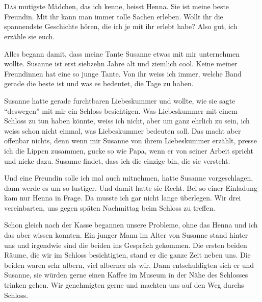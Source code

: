 \chapter*{}
\lettrine[lines=3]{\color{DeepPink}D}{as} mutigste Mädchen, das ich kenne, heisst Henna. Sie ist meine beste Freundin. Mit ihr kann man immer tolle Sachen erleben. Wollt ihr die spannendste Geschichte hören, die ich je mit ihr erlebt habe? Also gut, ich erzähle sie euch.

Alles begann damit, dass meine Tante Susanne etwas mit mir unternehmen wollte.
Susanne ist erst siebzehn Jahre alt und ziemlich cool. Keine meiner Freundinnen
hat eine so junge Tante. Von ihr weiss ich immer, welche Band gerade die beste
ist und was es bedeutet, die Tage zu haben.

Susanne hatte gerade furchtbaren Liebeskummer und wollte, wie sie sagte
\enquote{deswegen} mit mir ein Schloss besichtigen. Was Liebeskummer mit einem
Schloss zu tun haben könnte, weiss ich nicht, aber um ganz ehrlich zu sein, ich weiss schon nicht einmal, was Liebeskummer bedeuten soll. Das macht aber offenbar nichts, denn wenn mir Susanne von ihrem Liebeskummer erzählt, presse ich die Lippen zusammen, gucke so wie Papa, wenn er von seiner Arbeit spricht und nicke dazu. Susanne findet, dass ich die einzige bin, die sie versteht.

Und eine Freundin solle ich mal auch mitnehmen, hatte Susanne vorgeschlagen, dann werde es um so lustiger. Und damit hatte sie Recht. Bei so einer Einladung kam nur Henna in Frage. Da musste ich gar nicht lange überlegen. Wir drei vereinbarten, uns gegen späten Nachmittag beim Schloss zu treffen.

Schon gleich nach der Kasse begannen unsere Probleme, ohne das Henna und ich das aber wissen konnten. Ein junger Mann im Alter von Susanne stand hinter uns und irgendwie sind die beiden ins Gespräch gekommen. Die ersten beiden Räume, die wir im Schloss besichtigten, stand er die ganze Zeit neben uns. Die beiden waren sehr albern, viel alberner als wir. Dann entschuldigten sich er und Susanne, sie würden gerne einen Kaffee im Museum in der Nähe des Schlosses trinken gehen. Wir genehmigten gerne und machten uns auf den Weg durchs Schloss.

